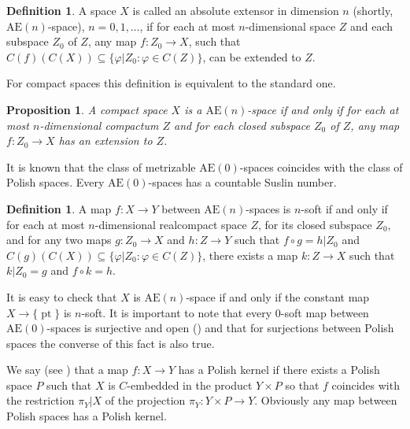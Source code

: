 \documentclass[12pt,draft]{amsart}
\theoremstyle{plain}
\newtheorem{pro}[thm]{Proposition}
\theoremstyle{definition}
\newtheorem{defin}[thm]{Definition}
\numberwithin{equation}{section}
\begin{document}
\begin{defin}\label{D:6.1.3}
A space $X$ is called an absolute  extensor in dimension $n$
(shortly, $\text{AE}(n)$-space), $n=0,1,\dots$, if for each at
most $n$-dimensional space $Z$ and each subspace $Z_0$ of $Z$,
any map $f \colon Z_0 \to X$, such that
$C(f)(C(X)) \subseteq \{ \varphi |Z_{0} \colon \varphi \in C(Z) \}$,
can be extended to $Z$.
\end{defin}

For compact spaces this definition is equivalent to the standard one.

\begin{pro}\label{P:6.1.11}
A compact space $X$ is a $\text{AE}(n)$-space
if and only if for each at most $n$-di\-men\-si\-o\-nal
compactum $Z$ and for each closed subspace $Z_0$ of $Z$,
any map $f \colon Z_0 \to X$ has an extension to  $Z$.
\end{pro}

It is known \cite[Chapter 6]{chibook96} that the
class of metrizable $\text{AE}(0)$-spaces
coincides with the class of Polish spaces. Every
$\text{AE}(0)$-spaces has a countable Suslin number. 

\begin{defin}\label{D:6.1.16}
A map $f \colon X \to Y$ between $\text{AE}(n)$-spaces
is $n$-soft if and only if for each at most $n$-dimensional
realcompact space $Z$, for its closed subspace $Z_0$, and for
any two maps $g \colon Z_0 \to X$ and $h \colon Z \to Y$ such that
$f\circ g = h|Z_0$ and
$C(g)(C(X)) \subseteq \{ \varphi |Z_{0} \colon \varphi \in C(Z)\}$,
there exists a map $k \colon Z \to X$ such that
$k|Z_0 = g$ and $f\circ k = h$.
\end{defin}

It is easy to check that $X$ is $\text{AE}(n)$-space if and only if
the constant map $X \to \{ \operatorname{pt}\}$ is $n$-soft.
It is important to note that every $0$-soft map between $\text{AE}(0)$-spaces
is surjective and open (\cite[Lemma 6.1.13 \& Proposition 6.1.26]{chibook96}) and that
for surjections between Polish spaces the converse of this fact is also true.

We say (see \cite[Section 6.3]{chibook96}) that
a map $f \colon X \to Y$ has a Polish kernel if there exists a Polish
space $P$ such that
$X$ is $C$-embedded in the product $Y \times P$ so that $f$ coincides
with the restriction $\pi_{Y}|X$ of the projection
$\pi_{Y} \colon Y \times P \to Y$. Obviously any map between
Polish spaces has a Polish kernel.
\end{document}
